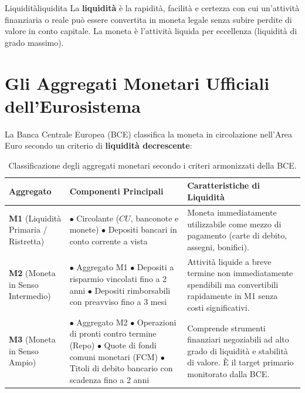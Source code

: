 \begin{definizione}{Liquidità}{liquidita}
La \textbf{liquidità} è la rapidità, facilità e certezza con cui un'attività finanziaria o reale può essere convertita in moneta legale senza subire perdite di valore in conto capitale. La moneta è l'attività liquida per eccellenza (liquidità di grado massimo).
\end{definizione}

\section{Gli Aggregati Monetari Ufficiali dell'Eurosistema}

La Banca Centrale Europea (BCE) classifica la moneta in circolazione nell'Area Euro secondo un criterio di \textbf{liquidità decrescente}:

\begin{table}[htbp]
\centering
\small
\renewcommand{\arraystretch}{1.35}
\begin{tabularx}{\textwidth}{l p{5.2cm} X}
\toprule
\textbf{Aggregato} & \textbf{Componenti Principali} & \textbf{Caratteristiche di Liquidità} \\
\midrule
\textbf{M1} (Liquidità Primaria / Ristretta) & 
$\bullet$ Circolante ($CU$, banconote e monete)\newline
$\bullet$ Depositi bancari in conto corrente a vista & 
Moneta immediatamente utilizzabile come mezzo di pagamento (carte di debito, assegni, bonifici). \\
\midrule
\textbf{M2} (Moneta in Senso Intermedio) & 
$\bullet$ Aggregato M1\newline
$\bullet$ Depositi a risparmio vincolati fino a 2 anni\newline
$\bullet$ Depositi rimborsabili con preavviso fino a 3 mesi & 
Attività liquide a breve termine non immediatamente spendibili ma convertibili rapidamente in M1 senza costi significativi. \\
\midrule
\textbf{M3} (Moneta in Senso Ampio) & 
$\bullet$ Aggregato M2\newline
$\bullet$ Operazioni di pronti contro termine (Repo)\newline
$\bullet$ Quote di fondi comuni monetari (FCM)\newline
$\bullet$ Titoli di debito bancario con scadenza fino a 2 anni & 
Comprende strumenti finanziari negoziabili ad alto grado di liquidità e stabilità di valore. È il target primario monitorato dalla BCE. \\
\bottomrule
\end{tabularx}
\caption{Classificazione degli aggregati monetari secondo i criteri armonizzati della BCE.}
\label{tab:aggregati_bce}
\end{table}

